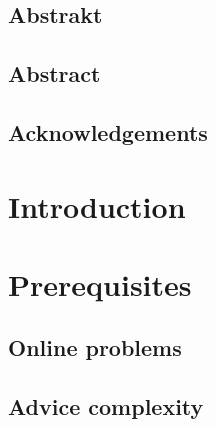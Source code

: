 \documentclass[12pt,a4paper]{report}
\begin{document}
\eject %


%

\eject

%

\eject

\section*{Abstrakt}


\eject

\section*{Abstract}


\eject

\section*{Acknowledgements}


\eject

\tableofcontents

\listoffigures
\listoftables

\chapter*{Introduction}
\setcounter{page}{1}
\label{chapter:intro}


\chapter{Prerequisites}
\label{chapter:first}

\section{Online problems}
\label{section:online}

\section{Advice complexity}
\label{section:advice}

\end{document}
